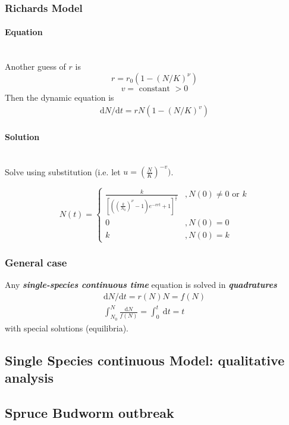 \newpage
\subsubsection{Richards Model}
\paragraph{Equation}~{}\\
Another guess of $r$ is 
$$
r=r_0\left(1-(N / K)^{\nu}\right)
$$
$$
v =\text{ constant } >0
$$
Then the dynamic equation is
\begin{align}
    \mathrm{d} N / \mathrm{d} t=r N(1-(N / K)^v) \label{eq1.8}
\end{align}

\paragraph{Solution}~{}\\
Solve  using substitution (i.e. let $u=(\frac{N}{K})^{-v})$. 

\begin{equation*}
    N(t)= \begin{cases}\frac{k}{\left[\left(\left(\frac{k}{N_{0}}\right)^{\nu}-1\right) e^{-v r t}+1\right]^{\frac{1}{v}}} &,N(0)\ne 0 \text{ or } k \\ 0&,N(0)=0 \\ k&,N(0)=k\end{cases}
\end{equation*}


\newpage

\subsubsection{General case}
Any \emph{\textbf{single-species continuous time}} equation is solved in \emph{\textbf{quadratures}}
\begin{align*}
    \mathrm{d} N / \mathrm{d} t=r(N) N=f(N)\\
    \int_{N_{0}}^{N} \frac{\mathrm{d} N}{f(N)}=\int_{0}^{t} \mathrm{~d} t=t
\end{align*}
with special solutions (equilibria).

\subsection{Single Species continuous Model: qualitative analysis}


\newpage

\subsection{Spruce Budworm outbreak}